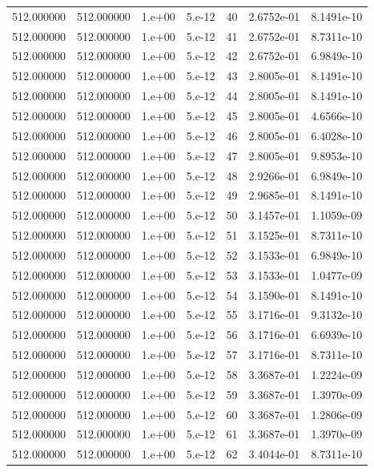 \begin{table}[htbp]
\begin{tabular}{rrrrrrr}
512.000000 & 512.000000 & 1.e+00 & 5.e-12 & 40 & 2.6752e-01 & 8.1491e-10 \\
512.000000 & 512.000000 & 1.e+00 & 5.e-12 & 41 & 2.6752e-01 & 8.7311e-10 \\
512.000000 & 512.000000 & 1.e+00 & 5.e-12 & 42 & 2.6752e-01 & 6.9849e-10 \\
512.000000 & 512.000000 & 1.e+00 & 5.e-12 & 43 & 2.8005e-01 & 8.1491e-10 \\
512.000000 & 512.000000 & 1.e+00 & 5.e-12 & 44 & 2.8005e-01 & 8.1491e-10 \\
512.000000 & 512.000000 & 1.e+00 & 5.e-12 & 45 & 2.8005e-01 & 4.6566e-10 \\
512.000000 & 512.000000 & 1.e+00 & 5.e-12 & 46 & 2.8005e-01 & 6.4028e-10 \\
512.000000 & 512.000000 & 1.e+00 & 5.e-12 & 47 & 2.8005e-01 & 9.8953e-10 \\
512.000000 & 512.000000 & 1.e+00 & 5.e-12 & 48 & 2.9266e-01 & 6.9849e-10 \\
512.000000 & 512.000000 & 1.e+00 & 5.e-12 & 49 & 2.9685e-01 & 8.1491e-10 \\
512.000000 & 512.000000 & 1.e+00 & 5.e-12 & 50 & 3.1457e-01 & 1.1059e-09 \\
512.000000 & 512.000000 & 1.e+00 & 5.e-12 & 51 & 3.1525e-01 & 8.7311e-10 \\
512.000000 & 512.000000 & 1.e+00 & 5.e-12 & 52 & 3.1533e-01 & 6.9849e-10 \\
512.000000 & 512.000000 & 1.e+00 & 5.e-12 & 53 & 3.1533e-01 & 1.0477e-09 \\
512.000000 & 512.000000 & 1.e+00 & 5.e-12 & 54 & 3.1590e-01 & 8.1491e-10 \\
512.000000 & 512.000000 & 1.e+00 & 5.e-12 & 55 & 3.1716e-01 & 9.3132e-10 \\
512.000000 & 512.000000 & 1.e+00 & 5.e-12 & 56 & 3.1716e-01 & 6.6939e-10 \\
512.000000 & 512.000000 & 1.e+00 & 5.e-12 & 57 & 3.1716e-01 & 8.7311e-10 \\
512.000000 & 512.000000 & 1.e+00 & 5.e-12 & 58 & 3.3687e-01 & 1.2224e-09 \\
512.000000 & 512.000000 & 1.e+00 & 5.e-12 & 59 & 3.3687e-01 & 1.3970e-09 \\
512.000000 & 512.000000 & 1.e+00 & 5.e-12 & 60 & 3.3687e-01 & 1.2806e-09 \\
512.000000 & 512.000000 & 1.e+00 & 5.e-12 & 61 & 3.3687e-01 & 1.3970e-09 \\
512.000000 & 512.000000 & 1.e+00 & 5.e-12 & 62 & 3.4044e-01 & 8.7311e-10 \\

\end{tabular}
\end{table}
